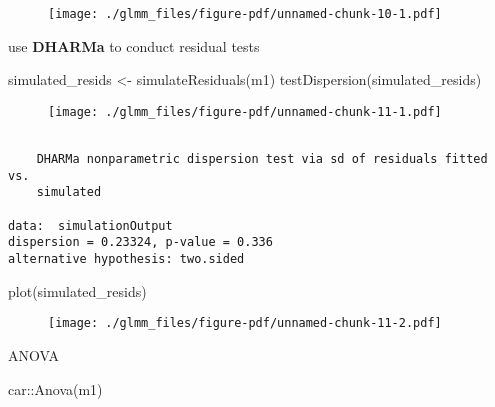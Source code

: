 \documentclass[
  letterpaper,
  DIV=11,
  numbers=noendperiod]{scrreprt}
\newenvironment{Shaded}{\begin{snugshade}}{\end{snugshade}}
\newcommand{\FunctionTok}[1]{\textcolor[rgb]{0.28,0.35,0.67}{#1}}
\newcommand{\NormalTok}[1]{\textcolor[rgb]{0.00,0.23,0.31}{#1}}
\newcommand{\OtherTok}[1]{\textcolor[rgb]{0.00,0.23,0.31}{#1}}
\newcommand{\SpecialCharTok}[1]{\textcolor[rgb]{0.37,0.37,0.37}{#1}}
\begin{document}
\begin{figure}[H]

{\centering \texttt{[image: ./glmm\_files/figure-pdf/unnamed-chunk-10-1.pdf]}

}

\end{figure}

use \textbf{DHARMa} to conduct residual tests

\begin{Shaded}
\begin{Highlighting}[]
\NormalTok{simulated\_resids }\OtherTok{\textless{}{-}} \FunctionTok{simulateResiduals}\NormalTok{(m1)}
\FunctionTok{testDispersion}\NormalTok{(simulated\_resids)}
\end{Highlighting}
\end{Shaded}

\begin{figure}[H]

{\centering \texttt{[image: ./glmm\_files/figure-pdf/unnamed-chunk-11-1.pdf]}

}

\end{figure}

\begin{verbatim}

    DHARMa nonparametric dispersion test via sd of residuals fitted vs.
    simulated

data:  simulationOutput
dispersion = 0.23324, p-value = 0.336
alternative hypothesis: two.sided
\end{verbatim}

\begin{Shaded}
\begin{Highlighting}[]
\FunctionTok{plot}\NormalTok{(simulated\_resids)}
\end{Highlighting}
\end{Shaded}

\begin{figure}[H]

{\centering \texttt{[image: ./glmm\_files/figure-pdf/unnamed-chunk-11-2.pdf]}

}

\end{figure}

ANOVA

\begin{Shaded}
\begin{Highlighting}[]
\NormalTok{car}\SpecialCharTok{::}\FunctionTok{Anova}\NormalTok{(m1)}
\end{Highlighting}
\end{Shaded}
\end{document}
